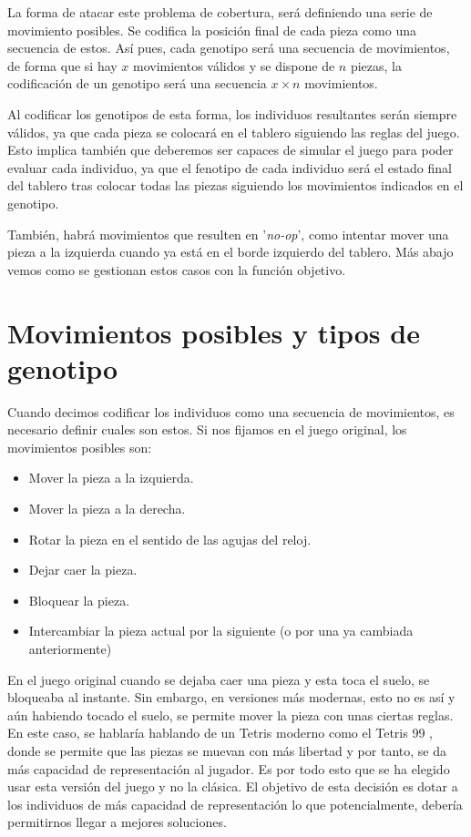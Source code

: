 \documentclass[11pt,spanish,listoffigures,listoftables]{tfgetsinf}
\begin{document}
La forma de atacar este problema de cobertura, será definiendo una serie de movimiento posibles. Se codifica la posición final de cada pieza como una secuencia de estos. Así pues, cada genotipo será una secuencia de movimientos, de forma que si hay $x$ movimientos válidos y se dispone de $n$ piezas, la codificación de un genotipo será una secuencia $x \times n$ movimientos.

Al codificar los genotipos de esta forma, los individuos resultantes serán siempre válidos, ya que cada pieza se colocará en el tablero siguiendo las reglas del juego. Esto implica también que deberemos ser capaces de simular el juego para poder evaluar cada individuo, ya que el fenotipo de cada individuo será el estado final del tablero tras colocar todas las piezas siguiendo los movimientos indicados en el genotipo.

También, habrá movimientos que resulten en '\textit{no-op}', como intentar mover una pieza a la izquierda cuando ya está en el borde izquierdo del tablero. Más abajo vemos como se gestionan estos casos con la función objetivo.

\section{Movimientos posibles y tipos de genotipo}
Cuando decimos codificar los individuos como una secuencia de movimientos, es necesario definir cuales son estos. Si nos fijamos en el juego original, los movimientos posibles son:

\begin{itemize}
    \item Mover la pieza a la izquierda.
    \item Mover la pieza a la derecha.
    \item Rotar la pieza en el sentido de las agujas del reloj.
    \item Dejar caer la pieza.
    \item Bloquear la pieza.
    \item Intercambiar la pieza actual por la siguiente (o por una ya cambiada anteriormente)
\end{itemize}

En el juego original cuando se dejaba caer una pieza y esta toca el suelo, se bloqueaba al instante. Sin embargo, en versiones más modernas, esto no es así y aún habiendo tocado el suelo, se permite mover la pieza con unas ciertas reglas. En este caso, se hablaría hablando de un Tetris moderno como el Tetris 99 \cite{}, donde se permite que las piezas se muevan con más libertad y por tanto, se da más capacidad de representación al jugador. Es por todo esto que se ha elegido usar esta versión del juego y no la clásica. El objetivo de esta decisión es dotar a los individuos de más capacidad de representación lo que potencialmente, debería permitirnos llegar a mejores soluciones.
\end{document}
